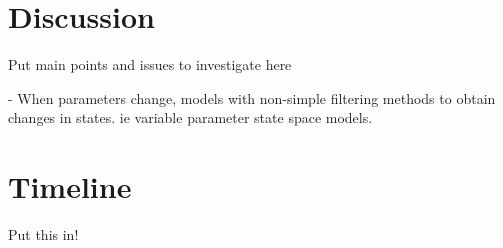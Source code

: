\documentclass[12pt,a4paper]{article}%
\numberwithin{equation}{section}
\begin{document}
\section{Discussion}

Put main points and issues to investigate here

- When parameters change, models with non-simple filtering methods to obtain changes in states. ie variable parameter state space models.

\section{Timeline}


Put this in!



\end{document}

